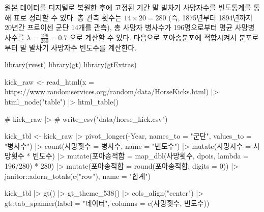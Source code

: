 \documentclass[
  letterpaper,
  chapter,a4paper,showtrims,openright,hidelinks]{oblivoir}
\newenvironment{Shaded}{\begin{snugshade}}{\end{snugshade}}
\newcommand{\AttributeTok}[1]{\textcolor[rgb]{0.40,0.45,0.13}{#1}}
\newcommand{\CommentTok}[1]{\textcolor[rgb]{0.37,0.37,0.37}{#1}}
\newcommand{\DecValTok}[1]{\textcolor[rgb]{0.68,0.00,0.00}{#1}}
\newcommand{\FunctionTok}[1]{\textcolor[rgb]{0.28,0.35,0.67}{#1}}
\newcommand{\NormalTok}[1]{\textcolor[rgb]{0.00,0.23,0.31}{#1}}
\newcommand{\OtherTok}[1]{\textcolor[rgb]{0.00,0.23,0.31}{#1}}
\newcommand{\SpecialCharTok}[1]{\textcolor[rgb]{0.37,0.37,0.37}{#1}}
\newcommand{\StringTok}[1]{\textcolor[rgb]{0.13,0.47,0.30}{#1}}
\begin{document}
원본 데이터를 디지털로 복원한 후에 고정된 기간 말 발차기 사망자수를
빈도통계를 통해 표로 정리할 수 있다. 총 관측 횟수는
\(14 \times 20 = 280\) (즉, 1875년부터 1894년까지 20년간 프로이센 군단
14개를 관측), 총 사망자 병사수가 196명으로부터 평균 사망병사수를
\(\lambda = \frac{196}{280} = 0.7\) 으로 계산할 수 있다. 다음으로
포아송분포에 적합시켜서 분포로부터 말 발차기 사망자수 빈도수를 계산한다.

\begin{Shaded}
\begin{Highlighting}[]
\FunctionTok{library}\NormalTok{(rvest)}
\FunctionTok{library}\NormalTok{(gt)}
\FunctionTok{library}\NormalTok{(gtExtras)}

\NormalTok{kick\_raw }\OtherTok{\textless{}{-}} \FunctionTok{read\_html}\NormalTok{(}\AttributeTok{x =} \StringTok{\textquotesingle{}https://www.randomservices.org/random/data/HorseKicks.html\textquotesingle{}}\NormalTok{) }\SpecialCharTok{|\textgreater{}} 
  \FunctionTok{html\_node}\NormalTok{(}\StringTok{"table"}\NormalTok{) }\SpecialCharTok{|\textgreater{}} 
  \FunctionTok{html\_table}\NormalTok{()}

\CommentTok{\# kick\_raw |\textgreater{} }
\CommentTok{\#   write\_csv("data/horse\_kick.csv")}

\NormalTok{kick\_tbl }\OtherTok{\textless{}{-}}\NormalTok{ kick\_raw }\SpecialCharTok{|\textgreater{}} 
  \FunctionTok{pivot\_longer}\NormalTok{(}\SpecialCharTok{{-}}\NormalTok{Year, }\AttributeTok{names\_to =} \StringTok{"군단"}\NormalTok{, }\AttributeTok{values\_to =} \StringTok{"병사수"}\NormalTok{) }\SpecialCharTok{|\textgreater{}} 
  \FunctionTok{count}\NormalTok{(사망횟수 }\OtherTok{=}\NormalTok{ 병사수, }\AttributeTok{name =} \StringTok{"빈도수"}\NormalTok{) }\SpecialCharTok{|\textgreater{}} 
  \FunctionTok{mutate}\NormalTok{(사망자수 }\OtherTok{=}\NormalTok{ 사망횟수 }\SpecialCharTok{*}\NormalTok{ 빈도수)  }\SpecialCharTok{|\textgreater{}} 
  \FunctionTok{mutate}\NormalTok{(포아송적합 }\OtherTok{=} \FunctionTok{map\_dbl}\NormalTok{(사망횟수, dpois, }\AttributeTok{lambda =} \DecValTok{196}\SpecialCharTok{/}\DecValTok{280}\NormalTok{) }\SpecialCharTok{*} \DecValTok{280}\NormalTok{) }\SpecialCharTok{|\textgreater{}} 
  \FunctionTok{mutate}\NormalTok{(포아송적합 }\OtherTok{=} \FunctionTok{round}\NormalTok{(포아송적합, }\AttributeTok{digits =} \DecValTok{0}\NormalTok{)) }\SpecialCharTok{|\textgreater{}} 
\NormalTok{  janitor}\SpecialCharTok{::}\FunctionTok{adorn\_totals}\NormalTok{(}\FunctionTok{c}\NormalTok{(}\StringTok{"row"}\NormalTok{), }\AttributeTok{name =} \StringTok{"합계"}\NormalTok{)}

\NormalTok{kick\_tbl }\SpecialCharTok{|\textgreater{}} 
  \FunctionTok{gt}\NormalTok{() }\SpecialCharTok{|\textgreater{}} 
  \FunctionTok{gt\_theme\_538}\NormalTok{() }\SpecialCharTok{|\textgreater{}} 
  \FunctionTok{cols\_align}\NormalTok{(}\StringTok{"center"}\NormalTok{) }\SpecialCharTok{|\textgreater{}} 
\NormalTok{  gt}\SpecialCharTok{::}\FunctionTok{tab\_spanner}\NormalTok{(}\AttributeTok{label =} \StringTok{"데이터"}\NormalTok{, }
                  \AttributeTok{columns =} \FunctionTok{c}\NormalTok{(사망횟수, 빈도수))}
\end{Highlighting}
\end{Shaded}
\end{document}
